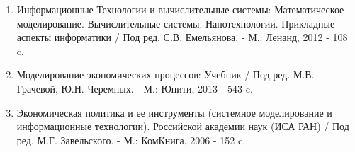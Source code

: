 \documentclass[a4paper,14pt]{extarticle}
\begin{document}
\newpage\mbox{}\newpage
{}
\begin{enumerate}
	\item Информационные Технологии и вычислительные системы: Математическое
	моделирование. Вычислительные системы. Нанотехнологии. Прикладные
	аспекты информатики / Под ред. С.В. Емельянова. - М.: Ленанд, 2012 - 108 c.
	\item  Моделирование экономических процессов: Учебник / Под ред. М.В.
	Грачевой, Ю.Н. Черемных. - М.: Юнити, 2013 - 543 c.
	\item  Экономическая политика и ее инструменты (системное моделирование и
	информационные
	технологии).
	Российской академии наук (ИСА РАН) / Под ред. М.Г. Завельского. - М.:
	КомКнига, 2006 - 152 c.
\end{enumerate}
\end{document}
